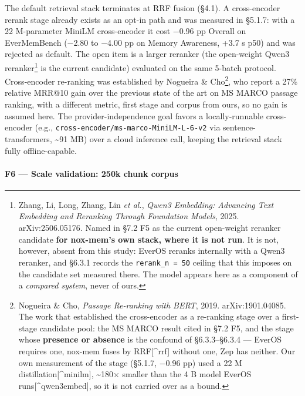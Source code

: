 \documentclass[
]{article}
\begin{document}
The default retrieval stack terminates at RRF fusion (§4.1). A
cross-encoder rerank stage already exists as an opt-in path and was
measured in §5.1.7: with a 22 M-parameter MiniLM cross-encoder it cost
−0.96 pp Overall on EverMemBench (−2.80 to −4.00 pp on Memory Awareness,
+3.7 s p50) and was rejected as default. The open item is a larger
reranker (the open-weight Qwen3 reranker\footnote{Zhang, Li, Long,
  Zhang, Lin \emph{et al.}, \emph{Qwen3 Embedding: Advancing Text
  Embedding and Reranking Through Foundation Models}, 2025.
  arXiv:2506.05176. Named in §7.2 F5 as the current open-weight reranker
  candidate \textbf{for nox-mem's own stack, where it is not run}. It is
  not, however, absent from this study: EverOS reranks internally with a
  Qwen3 reranker, and §6.3.1 records the \texttt{rerank\_n\ =\ 50}
  ceiling that this imposes on the candidate set measured there. The
  model appears here as a component of a \emph{compared system}, never
  of ours.} is the current candidate) evaluated on the same 5-batch
protocol. Cross-encoder re-ranking was established by Nogueira \&
Cho\footnote{Nogueira \& Cho, \emph{Passage Re-ranking with BERT}, 2019.
  arXiv:1901.04085. The work that established the cross-encoder as a
  re-ranking stage over a first-stage candidate pool: the MS MARCO
  result cited in §7.2 F5, and the stage whose \textbf{presence or
  absence} is the confound of §6.3.3--§6.3.4 --- EverOS requires one,
  nox-mem fuses by RRF{[}\^{}rrf{]} without one, Zep has neither. Our
  own measurement of the stage (§5.1.7, −0.96 pp) used a 22 M
  distillation{[}\^{}minilm{]}, \textasciitilde180× smaller than the 4 B
  model EverOS runs{[}\^{}qwen3embed{]}, so it is not carried over as a
  bound.}, who report a 27\% relative MRR@10 gain over the previous
state of the art on MS MARCO passage ranking, with a different metric,
first stage and corpus from ours, so no gain is assumed here. The
provider-independence goal favors a locally-runnable cross-encoder
(e.g., \texttt{cross-encoder/ms-marco-MiniLM-L-6-v2} via
sentence-transformers, \textasciitilde91 MB) over a cloud inference
call, keeping the retrieval stack fully offline-capable.

\paragraph{F6 --- Scale validation: 250k chunk
corpus}\label{f6-scale-validation-250k-chunk-corpus}
\end{document}
